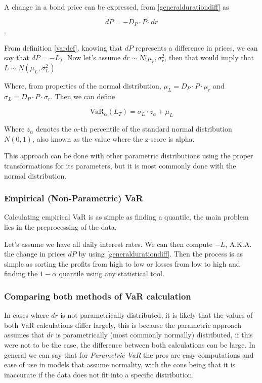 \documentclass[10pt,letterpaper]{article}
\begin{document}
A change in a bond price can be expressed, from \eqref{generaldurationdiff} as 

$$dP = - D_P\cdot P\cdot dr$$.

From definition \ref{vardef}, knowing that $dP$ represents a difference in prices, we can say that $dP = -L_T$. Now let's assume $dr \sim N(\mu_r, \sigma_r^2$, then that would imply that $L\sim N(\mu_L, \sigma_L^2)$

Where, from properties of the normal distribution, $\mu_L = D_P\cdot P \cdot \mu_r$ and $\sigma_L = D_P\cdot P\cdot\sigma_r$. Then we can define

\begin{equation}\label{normalvar}
\mbox{VaR}_\alpha(L_T) = \sigma_L \cdot z_\alpha +\mu_L
\end{equation}

Where $z_\alpha$ denotes the $\alpha$-th percentile of the standard normal distribution $N(0,1)$, also known as the value where the z-score is alpha.

This approach can be done with other parametric distributions using the proper transformations for its parameters, but it is most commonly done with the normal distribution.

\subsubsection{Empirical (Non-Parametric) VaR}

Calculating empirical VaR is as simple as finding a quantile, the main problem lies in the preprocessing of the data. 

Let's assume we have all daily interest rates. We can then compute $-L$, A.K.A. the change in prices $dP$ by using \eqref{generaldurationdiff}. Then the process is as simple as sorting the profits from high to low or losses from low to high and finding the $1-\alpha$ quantile using any statistical tool.

\subsubsection{Comparing both methods of VaR calculation}

In cases where $dr$ is not parametrically distributed, it is likely that the values of both VaR calculations differ largely, this is because the parametric approach assumes that $dr$ is parametrically (most commonly normally) distributed, if this were not to be the case, the difference between both calculations can be large. In general we can say that for \emph{Parametric VaR} the pros are easy computations and ease of use in models that assume normality, with the cons being that it is inaccurate if the data does not fit into a specific distribution.
\end{document}
